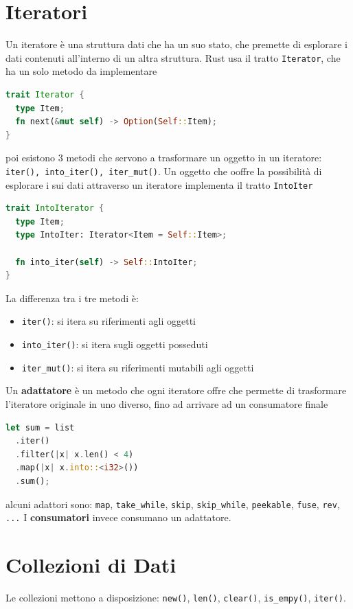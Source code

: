 \documentclass[12pt]{article}
\begin{document}
\section{Iteratori}
Un iteratore \`e una struttura dati che ha un suo stato, che premette di esplorare i dati contenuti all'interno di un altra struttura. Rust usa il tratto \texttt{Iterator}, che ha un solo metodo da implementare
\begin{lstlisting}[language=rust]
trait Iterator {
  type Item;
  fn next(&mut self) -> Option(Self::Item);
}
\end{lstlisting}
poi esistono 3 metodi che servono a trasformare un oggetto in un iteratore: \texttt{iter(), into\_iter(), iter\_mut()}. Un oggetto che ooffre la possibilit\`a di esplorare i sui dati attraverso un iteratore implementa il tratto \texttt{IntoIter}
\begin{lstlisting}[language=rust]
trait IntoIterator {
  type Item;
  type IntoIter: Iterator<Item = Self::Item>;

  fn into_iter(self) -> Self::IntoIter;
}
\end{lstlisting}
La differenza tra i tre metodi \`e:
\begin{itemize}
  \item \texttt{iter()}: si itera su riferimenti agli oggetti
  \item \texttt{into\_iter()}: si itera sugli oggetti posseduti
  \item \texttt{iter\_mut()}: si itera su riferimenti mutabili agli oggetti
\end{itemize}

Un \textbf{adattatore} \`e un metodo che ogni iteratore offre che permette di trasformare l'iteratore originale in uno diverso, fino ad arrivare ad un consumatore finale
\begin{lstlisting}[language=rust]
let sum = list
  .iter()
  .filter(|x| x.len() < 4)
  .map(|x| x.into::<i32>())
  .sum();
\end{lstlisting}
alcuni adattori sono: \texttt{map}, \texttt{take\_while}, \texttt{skip}, \texttt{skip\_while}, \texttt{peekable}, \texttt{fuse}, \texttt{rev}, \texttt{...} I \textbf{consumatori} invece consumano un adattatore.


\section{Collezioni di Dati}
Le collezioni mettono a disposizione: \texttt{new()}, \texttt{len()}, \texttt{clear()}, \texttt{is\_empy()}, \texttt{iter()}.
\end{document}
